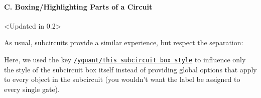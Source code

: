 \documentclass{scrartcl}
\makeatletter
\newenvironment{codeexample*}{%
   \VerbatimEnvironment%
   \let\FVB@VerbatimOut\minted@FVB@VerbatimOut
   \let\FVE@VerbatimOut\minted@FVE@VerbatimOut
   \minted@configlang{tex}%
   \minted@fvset
   \begin{VerbatimOut}[codes={\catcode`\^^I=12},firstline,lastline]{\minted@jobname.pyg}%
}{
   \end{VerbatimOut}%
   \minted@langlinenoson%
   \begin{adjustbox}{center}
       \minted@jobname.pyg %
   \end{adjustbox}\nopagebreak
   \expandafter\minted@pygmentize\expandafter{\minted@lang}%
   \minted@langlinenosoff%
   \par%
}
\def\style#1{\hyperref[style:#1]{\texttt{#1}}}
\makeatother
\begin{document}
            \paragraph{C. Boxing/Highlighting Parts of a Circuit}\leavevmode
               \begin{example}<Updated in 0.2>
                  \begin{codeexample*}
                  \end{codeexample*}
                  As usual, subcircuits provide a similar experience, but respect the separation:
                  \begin{codeexample*}
                  \end{codeexample*}
                  Here, we used the key \style{/yquant/this subcircuit box style} to influence only the style of the subcircuit box itself instead of providing global options that apply to every object in the subcircuit (you wouldn't want the label be assigned to every single gate).
               \end{example}
\end{document}
